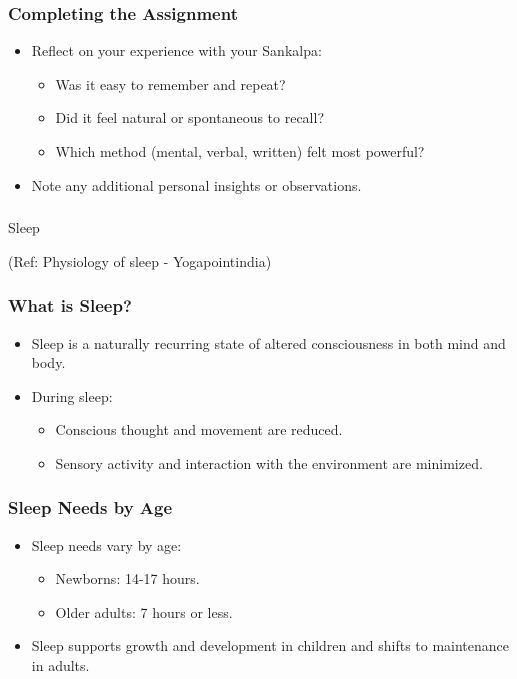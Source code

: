 \begin{frame}[fragile]\frametitle{Completing the Assignment}
    \begin{itemize}
        \item Reflect on your experience with your Sankalpa:
        \begin{itemize}
            \item Was it easy to remember and repeat?
            \item Did it feel natural or spontaneous to recall?
            \item Which method (mental, verbal, written) felt most powerful?
        \end{itemize}
        \item Note any additional personal insights or observations.
    \end{itemize}
\end{frame}


\begin{frame}[fragile]\frametitle{}
\begin{center}
{\Large Sleep}

(Ref: Physiology of sleep - Yogapointindia)
\end{center}
\end{frame}

\begin{frame}[fragile]\frametitle{What is Sleep?}
    \begin{itemize}
        \item Sleep is a naturally recurring state of altered consciousness in both mind and body.
        \item During sleep:
        \begin{itemize}
            \item Conscious thought and movement are reduced.
            \item Sensory activity and interaction with the environment are minimized.
        \end{itemize}
    \end{itemize}
\end{frame}

\begin{frame}[fragile]\frametitle{Sleep Needs by Age}
    \begin{itemize}
        \item Sleep needs vary by age:
        \begin{itemize}
            \item Newborns: 14-17 hours.
            \item Older adults: 7 hours or less.
        \end{itemize}
        \item Sleep supports growth and development in children and shifts to maintenance in adults.
    \end{itemize}
\end{frame}

